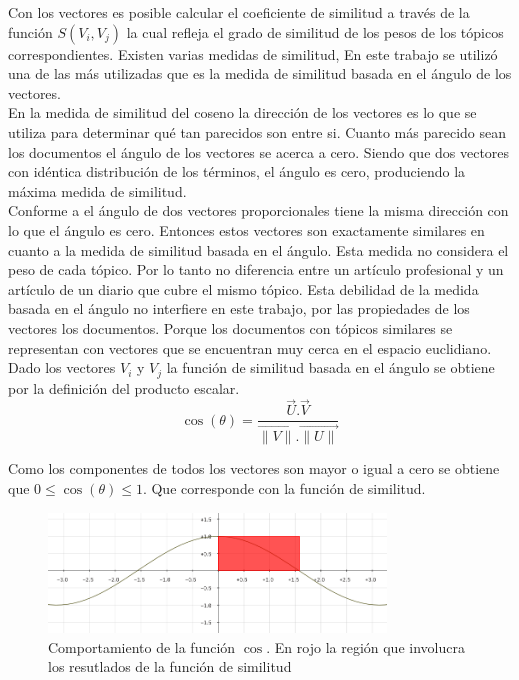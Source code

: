Con los vectores es posible calcular el coeficiente de similitud a través de la función $ S (V_i, V_j)$ la cual refleja el grado de similitud de los pesos de los tópicos correspondientes. Existen varias medidas de similitud, En este trabajo se utilizó una de las más utilizadas que es la medida de similitud basada en el ángulo de los vectores.\\
En la medida de similitud del coseno la dirección de los vectores es lo que se utiliza para determinar qué tan parecidos son entre si. Cuanto más parecido sean los documentos el ángulo de los vectores se acerca a cero. Siendo que dos vectores con idéntica distribución de los términos, el ángulo es cero, produciendo la máxima medida de similitud.\\
Conforme a \cite{newSimilarity} el ángulo de dos vectores proporcionales tiene la misma dirección con lo que el ángulo es cero. Entonces estos vectores son exactamente similares en cuanto a la medida de similitud basada en el ángulo. Esta medida no considera el peso de cada tópico. Por lo tanto no diferencia entre un artículo profesional y un artículo de un diario que cubre el mismo tópico. Esta debilidad de la medida basada en el ángulo no interfiere en este trabajo, por las propiedades de los vectores los documentos. Porque los documentos con tópicos similares se representan con vectores que se encuentran muy cerca en el espacio euclidiano. Dado los vectores $V_i$ y $V_j$ la función de similitud basada en el ángulo se obtiene por la definición del producto escalar.\\

\begin{equation} \label{eq:angulovectorial}
\cos(\theta) =  \dfrac{\overrightarrow{U} . \overrightarrow{V}}{\overrightarrow{\lVert V\lVert}.\overrightarrow{\lVert U\lVert}}
\end{equation}

Como los componentes de todos los vectores son mayor o igual a cero se obtiene que $0\leq\cos(\theta)\leq1$. Que corresponde con la función de similitud.

\begin{figure}[H]
\includegraphics[width=0.8\textwidth]{img/coseno.png}
\caption{Comportamiento de la función $\cos$. En rojo la región que involucra los resutlados de la función de similitud}
\label{bus:img-coseno}
\end{figure}


